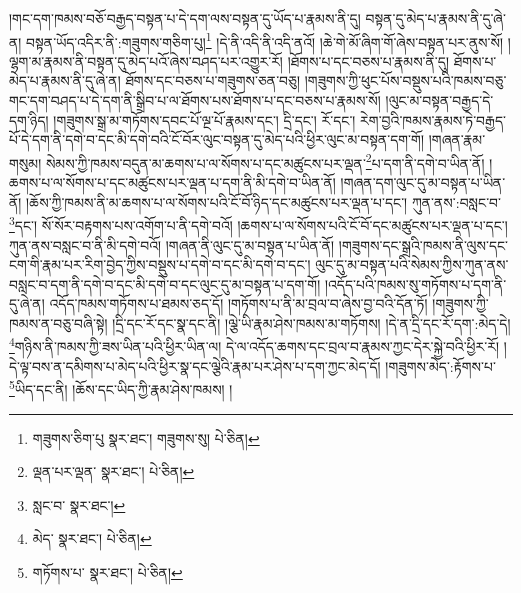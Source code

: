 །གང་དག་ཁམས་བཅོ་བརྒྱད་བསྟན་པ་དེ་དག་ལས་བསྟན་དུ་ཡོད་པ་རྣམས་ནི་དུ། བསྟན་དུ་མེད་པ་རྣམས་ནི་དུ་ཞེ་ན། བསྟན་ཡོད་འདིར་ནི་:གཟུགས་གཅིག་པུ།\footnote{གཟུགས་ཅིག་པུ  སྣར་ཐང་། གཟུགས་སུ།  པེ་ཅིན། } །དེ་ནི་འདི་ནི་འདི་ནའོ། །ཆེ་གེ་མོ་ཞིག་གོ་ཞེས་བསྟན་པར་ནུས་སོ། །ལྷག་མ་རྣམས་ནི་བསྟན་དུ་མེད་པའོ་ཞེས་བཤད་པར་འགྱུར་རོ། །ཐོགས་པ་དང་བཅས་པ་རྣམས་ནི་དུ། ཐོགས་པ་མེད་པ་རྣམས་ནི་དུ་ཞེ་ན། ཐོགས་དང་བཅས་པ་གཟུགས་ཅན་བཅུ། །གཟུགས་ཀྱི་ཕུང་པོས་བསྡུས་པའི་ཁམས་བཅུ་གང་དག་བཤད་པ་དེ་དག་ནི་སྒྲིབ་པ་ལ་ཐོགས་པས་ཐོགས་པ་དང་བཅས་པ་རྣམས་སོ། །ལུང་མ་བསྟན་བརྒྱད་དེ་དག་ཉིད། །གཟུགས་སྒྲ་མ་གཏོགས་དབང་པོ་ལྔ་པོ་རྣམས་དང་། དྲི་དང་། རོ་དང་། རེག་བྱའི་ཁམས་རྣམས་ཏེ་བརྒྱད་པོ་དེ་དག་ནི་དགེ་བ་དང་མི་དགེ་བའི་ངོ་བོར་ལུང་བསྟན་དུ་མེད་པའི་ཕྱིར་ལུང་མ་བསྟན་དག་གོ། །གཞན་རྣམ་གསུམ། སེམས་ཀྱི་ཁམས་བདུན་མ་ཆགས་པ་ལ་སོགས་པ་དང་མཚུངས་པར་ལྡན་\footnote{ལྡན་པར་ལྡན་  སྣར་ཐང་།  པེ་ཅིན། }པ་དག་ནི་དགེ་བ་ཡིན་ནོ། །ཆགས་པ་ལ་སོགས་པ་དང་མཚུངས་པར་ལྡན་པ་དག་ནི་མི་དགེ་བ་ཡིན་ནོ། །གཞན་དག་ལུང་དུ་མ་བསྟན་པ་ཡིན་ནོ། །ཆོས་ཀྱི་ཁམས་ནི་མ་ཆགས་པ་ལ་སོགས་པའི་ངོ་བོ་ཉིད་དང་མཚུངས་པར་ལྡན་པ་དང་། ཀུན་ནས་:བསླང་བ་\footnote{སླང་བ་  སྣར་ཐང་། }དང་། སོ་སོར་བརྟགས་པས་འགོག་པ་ནི་དགེ་བའོ། །ཆགས་པ་ལ་སོགས་པའི་ངོ་བོ་དང་མཚུངས་པར་ལྡན་པ་དང་། ཀུན་ནས་བསླང་བ་ནི་མི་དགེ་བའོ། །གཞན་ནི་ལུང་དུ་མ་བསྟན་པ་ཡིན་ནོ། །གཟུགས་དང་སྒྲའི་ཁམས་ནི་ལུས་དང་ངག་གི་རྣམ་པར་རིག་བྱེད་ཀྱིས་བསྡུས་པ་དགེ་བ་དང་མི་དགེ་བ་དང་། ལུང་དུ་མ་བསྟན་པའི་སེམས་ཀྱིས་ཀུན་ནས་བསླང་བ་དག་ནི་དགེ་བ་དང་མི་དགེ་བ་དང་ལུང་དུ་མ་བསྟན་པ་དག་གོ། །འདོད་པའི་ཁམས་སུ་གཏོགས་པ་དག་ནི་དུ་ཞེ་ན། འདོད་ཁམས་གཏོགས་པ་ཐམས་ཅད་དོ། །གཏོགས་པ་ནི་མ་བྲལ་བ་ཞེས་བྱ་བའི་དོན་ཏོ། །གཟུགས་ཀྱི་ཁམས་ན་བཅུ་བཞི་སྟེ། །དྲི་དང་རོ་དང་སྣ་དང་ནི། །ལྕེ་ཡི་རྣམ་ཤེས་ཁམས་མ་གཏོགས། །དེ་ན་དྲི་དང་རོ་དག་:མེད་དེ། \footnote{མེད་  སྣར་ཐང་།  པེ་ཅིན། }གཉིས་ནི་ཁམས་ཀྱི་ཟས་ཡིན་པའི་ཕྱིར་ཡིན་ལ། དེ་ལ་འདོད་ཆགས་དང་བྲལ་བ་རྣམས་ཀྱང་དེར་སྐྱེ་བའི་ཕྱིར་རོ། །དེ་ལྟ་བས་ན་དམིགས་པ་མེད་པའི་ཕྱིར་སྣ་དང་ལྕེའི་རྣམ་པར་ཤེས་པ་དག་ཀྱང་མེད་དོ། །གཟུགས་མེད་:རྟོགས་པ་\footnote{གཏོགས་པ་  སྣར་ཐང་།  པེ་ཅིན། }ཡིད་དང་ནི། །ཆོས་དང་ཡིད་ཀྱི་རྣམ་ཤེས་ཁམས། །
